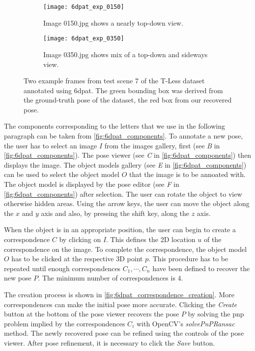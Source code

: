 \begin{figure}[!tbp]
	\centering
	\begin{subfigure}[t]{0.47\textwidth}
		\centering
    	\texttt{[image: 6dpat\_exp\_0150]}
    	\caption{Image 0150.jpg shows a nearly top-down view.}
    	\label{fig:6dpat_exp_0150}
	\end{subfigure}
	\hfill
	\begin{subfigure}[t]{0.47\textwidth}
	\centering
    	\texttt{[image: 6dpat\_exp\_0350]}
    	\caption{Image 0350.jpg shows mix of a top-down and sideways view.}
    	\label{fig:6dpat_exp_0500}
	\end{subfigure}
	\caption{Two example frames from test scene 7 of the T-Less dataset annotated using \ac{6dpat}. The green bounding box was derived from the ground-truth pose of the dataset, the red box from our recovered pose.}
	\label{fig:6dpat_exps}
\end{figure} 

The components corresponding to the letters that we use in the following paragraph can be taken from \fig \ref{fig:6dpat_components}. To annotate a new pose, the user has to select an image $I$ from the images gallery, first (see \textit{B} in \fig \ref{fig:6dpat_components}). The pose viewer (see \textit{C} in \fig \ref{fig:6dpat_components}) then displays the image. The object models gallery (see \textit{E} in \fig \ref{fig:6dpat_components}) can be used to select the object model $O$ that the image is to be annoated with. The object model is displayed by the pose editor (see \textit{F} in \fig \ref{fig:6dpat_components}) after selection. The user can rotate the object to view otherwise hidden areas. Using the arrow keys, the user can move the object along the $x$ and $y$ axis and also, by pressing the shift key, along the $z$ axis. 

When the object is in an appropriate position, the user can begin to create a correspondence $C$ by clicking on $I$. This defines the 2D location $u$ of the correspondence on the image. To complete the correspondence, the object model $O$ has to be clicked at the respective 3D point $p$. This procedure has to be repeated until enough correspondences $C_1, \cdots, C_n$ have been defined to recover the new pose $P$. The minimum number of correspondences is $4$. 

The creation process is shown in \fig \ref{fig:6dpat_correspondence_creation}. More correspondences can make the initial pose more accurate. Clicking the \textit{Create} button at the bottom of the pose viewer recovers the pose $P$ by solving the \ac{pnp} problem implied by the correspondences $C_i$ with OpenCV's \textit{solvePnPRansac} method. The newly recovered pose can be refined using the controls of the pose viewer. After pose refinement, it is necessary to click the \textit{Save} button.

